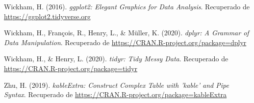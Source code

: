 \documentclass[
  english]{revcoles}
\newlength{\cslhangindent}
\newenvironment{cslreferences}%
  {\setlength{\parindent}{0pt}%
  \everypar{\setlength{\hangindent}{\cslhangindent}}\ignorespaces}%
  {\par}
\begin{document}
\begin{cslreferences}
\leavevmode\hypertarget{ref-ggplot2}{}%
Wickham, H. (2016). \emph{ggplot2: Elegant Graphics for Data Analysis}.
Recuperado de \url{https://ggplot2.tidyverse.org}

\leavevmode\hypertarget{ref-dplyr}{}%
Wickham, H., François, R., Henry, L., \& Müller, K. (2020). \emph{dplyr:
A Grammar of Data Manipulation}. Recuperado de
\url{https://CRAN.R-project.org/package=dplyr}

\leavevmode\hypertarget{ref-tidyr}{}%
Wickham, H., \& Henry, L. (2020). \emph{tidyr: Tidy Messy Data}.
Recuperado de \url{https://CRAN.R-project.org/package=tidyr}

\leavevmode\hypertarget{ref-kableExtra}{}%
Zhu, H. (2019). \emph{kableExtra: Construct Complex Table with 'kable'
and Pipe Syntax}. Recuperado de
\url{https://CRAN.R-project.org/package=kableExtra}
\end{cslreferences}
\end{document}
